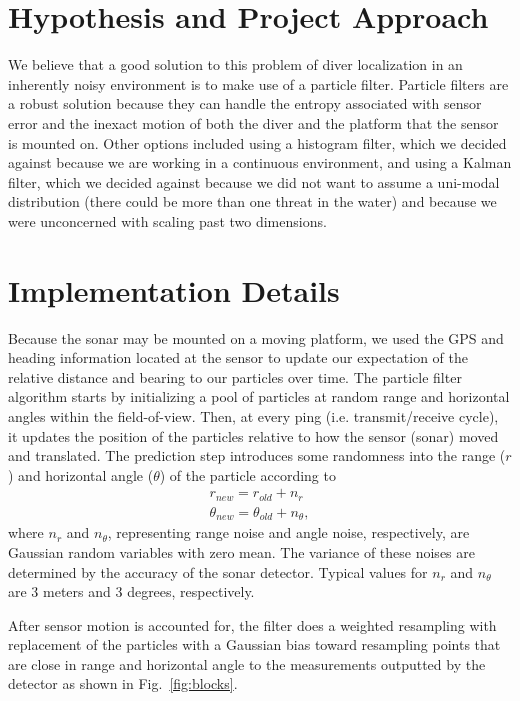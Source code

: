 \documentclass{article} %
\begin{document}
\section{Hypothesis and Project Approach}
We believe that a good solution to this problem of diver localization in an inherently noisy environment is to make use of a particle filter. Particle filters are a robust solution because they can handle the entropy associated with sensor error and the inexact motion of both the diver and the platform that the sensor is mounted on.
Other options included using a histogram filter, which we decided against because we are working in a continuous environment, and using a Kalman filter, which we decided against because we did not want to assume a uni-modal distribution (there could be more than one threat in the water) and because we were unconcerned with scaling past two dimensions.

\section{Implementation Details}
Because the sonar may be mounted on a moving platform, we used the GPS and heading information located at the sensor to update our expectation of the relative distance and bearing to our particles over time. The particle filter algorithm starts by initializing a pool of particles at random range and horizontal angles within the field-of-view. Then, at every ping (i.e. transmit/receive cycle), it updates the position of the particles relative to how the sensor (sonar) moved and translated. The prediction step introduces some randomness into the range ($r$) and horizontal angle ($\theta$) of the particle according to
\begin{eqnarray*}
  r_{new} = r_{old} + n_r \\
  \theta_{new} = \theta_{old} + n_{\theta},
\end{eqnarray*}
where $n_r$ and $n_{\theta}$, representing range noise and angle noise, respectively, are Gaussian random variables with zero mean. The variance of these noises are determined by the accuracy of the sonar detector. Typical values for $n_r$ and $n_{\theta}$ are 3 meters and 3 degrees, respectively.

After sensor motion is accounted for, the filter does a weighted resampling with replacement of the particles with a Gaussian bias toward resampling points that are close in range and horizontal angle to the measurements outputted by the detector as shown in Fig.~\ref{fig:blocks}.
\end{document}
